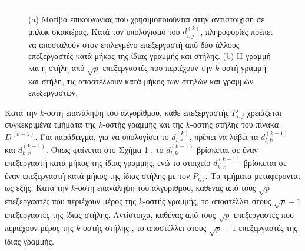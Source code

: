 \documentclass[12pt,a4paper]{article} %
\begin{document}
{\begin{figure}[H]
\vspace{0.3cm}
\noindent\rule{\textwidth}{0.2pt}
\caption{(a) Μοτίβα επικοινωνίας που χρησιμοποιούνται στην αντιστοίχιση σε μπλοκ
σκακιέρας. Κατά τον υπολογισμό του $d^{(k)}_{i,j}$, πληροφορίες πρέπει να
αποσταλούν στον επιλεγμένο επεξεργαστή από δύο άλλους επεξεργαστές κατά
μήκος της ίδιας γραμμής και στήλης. (b) Η γραμμή και η στήλη από $\sqrt{p}$
επεξεργαστές που περιέχουν την $k$-οστή γραμμή και στήλη, τις αποστέλλουν κατά
μήκος των στηλών και γραμμών επεξεργαστών.}
\label{fig:graph10}
\end{figure}

Κατά την $k$-οστή επανάληψη του αλγορίθμου, κάθε επεξεργαστής $P_{i,j}$ χρειάζεται 
συγκεκριμένα τμήματα της $k$-οστής γραμμής και της $k$-οστής στήλης του πίνακα 
$D^{(k-1)}$. Για παράδειγμα, για να υπολογίσει το $d^{(k)}_{l,r}$, πρέπει να λάβει 
τα $d^{(k-1)}_{l,k}$ και $d^{(k-1)}_{k,r}$.
Όπως φαίνεται στο Σχήμα \ref{fig:graph10} , το $d^{(k-1)}_{l,k}$ βρίσκεται σε έναν επεξεργαστή 
κατά μήκος της ίδιας γραμμής, ενώ το στοιχείο $d^{(k-1)}_{k,r}$ βρίσκεται σε έναν 
επεξεργαστή κατά μήκος της ίδιας στήλης με τον $P_{i,j}$.
Τα τμήματα μεταφέρονται ως εξής. Κατά την $k$-οστή επανάληψη του αλγορίθμου, 
καθένας από τους $\sqrt{p}$ επεξεργαστές που περιέχουν μέρος της $k$-οστής γραμμής, το αποστέλλει στους $\sqrt{p} - 1$ επεξεργαστές της ίδιας στήλης. Αντίστοιχα, 
καθένας από τους $\sqrt{p}$ επεξεργαστές που περιέχουν μέρος της $k$-οστής στήλης , το αποστέλλει στους $\sqrt{p} - 1$ επεξεργαστές της ίδιας γραμμής.

}
\end{document}
